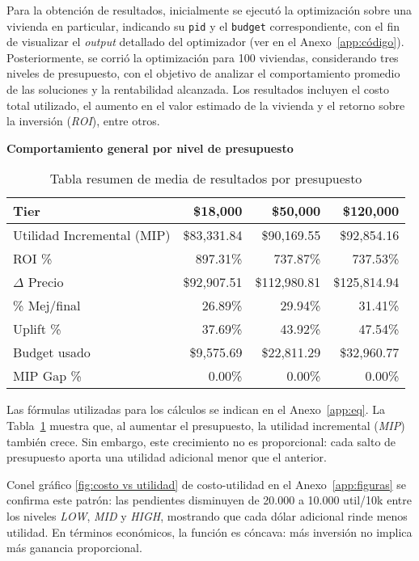 Para la obtención de resultados, inicialmente se ejecutó la optimización sobre una vivienda en particular, indicando su \texttt{pid} y el \texttt{budget} correspondiente, con el fin de visualizar el \textit{output} detallado del optimizador (ver en el Anexo~\ref{app:código}). 
Posteriormente, se corrió la optimización para 100 viviendas, considerando tres niveles de presupuesto, con el objetivo de analizar el comportamiento promedio de las soluciones y la rentabilidad alcanzada.  Los resultados incluyen el costo total utilizado, el aumento en el valor estimado de la vivienda y el retorno sobre la inversión (\textit{ROI}), entre otros.

\noindent\textbf{Comportamiento general por nivel de presupuesto}

\begin{table}[H]
\centering
\scriptsize %
\setlength{\tabcolsep}{4pt} %
\renewcommand{\arraystretch}{0.8} %
\caption{Tabla resumen de media de resultados por presupuesto}
\begin{tabular}{lrrr}
\hline
\textbf{Tier} & \textbf{\$18,000} & \textbf{\$50,000} & \textbf{\$120,000} \\
\hline
Utilidad Incremental (MIP) & \$83,331.84 & \$90,169.55 & \$92,854.16 \\
ROI \% & 897.31\% & 737.87\% & 737.53\% \\
$\Delta$ Precio & \$92,907.51 & \$112,980.81 & \$125,814.94 \\
\% Mej/final & 26.89\% & 29.94\% & 31.41\% \\
Uplift \% & 37.69\% & 43.92\% & 47.54\% \\
Budget usado & \$9,575.69 & \$22,811.29 & \$32,960.77 \\
MIP Gap \% & 0.00\% & 0.00\% & 0.00\% \\
\hline
\end{tabular}
\label{tab:resumen_por_precio}
\end{table}


Las fórmulas utilizadas para los cálculos se indican en el Anexo~\ref{app:eq}. La Tabla~\ref{tab:resumen_por_precio} muestra que, al aumentar el presupuesto, la utilidad incremental (\textit{MIP}) también crece. Sin embargo, este crecimiento no es proporcional: cada salto de presupuesto aporta una utilidad adicional menor que el anterior.  

Conel gráfico \ref{fig:costo vs utilidad} de costo-utilidad en el Anexo~\ref{app:figuras} se confirma este patrón: las pendientes disminuyen de 20.000 a 10.000 util/10k entre los niveles \textit{LOW}, \textit{MID} y \textit{HIGH}, mostrando que cada dólar adicional rinde menos utilidad. En términos económicos, la función es cóncava: más inversión no implica más ganancia proporcional.  

